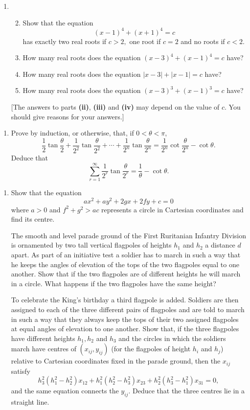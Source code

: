 \documentclass[a4, 11pt]{report}
\newlength{\qspace}
\newcounter{qnumber}
\newenvironment{question}%
 {\vspace{\qspace}
  \begin{enumerate}[\bfseries 1\quad][10]%
    \setcounter{enumi}{\value{qnumber}}%
    \item%
 }
{
  \end{enumerate}
  \filbreak
  \stepcounter{qnumber}
 }
\newenvironment{questionparts}[1][1]%
 {
  \begin{enumerate}[\bfseries (i)]%
    \setcounter{enumii}{#1}
    \addtocounter{enumii}{-1}
    \setlength{\itemsep}{5mm}
    \setlength{\parskip}{8pt}
 }
 {
  \end{enumerate}
 }
\begin{document}
\begin{question}
\begin{questionparts}
\item Show that the equation 
\[
(x-1)^{4}+(x+1)^{4}=c
\]
has exactly two real roots if $c>2,$ one root if $c=2$ and no roots
if $c<2$. 
\item How many real roots does the equation $\left(x-3\right)^{4}+\left(x-1\right)^{4}=c$
have?
\item How many real roots does the equation $\left|x-3\right|+\left|x-1\right|=c$
have?
\item How many real roots does the equation $\left(x-3\right)^{3}+\left(x-1\right)^{3}=c$
have?
\end{questionparts}

{[}The answers to parts \textbf{(ii)}, \textbf{(iii)} and \textbf{(iv)}
may depend on the value of $c$. You should give reasons for your
answers.{]}
	\end{question}
	
\begin{question}
Prove by induction, or otherwise, that, if $0<\theta<\pi$, 
\[
\frac{1}{2}\tan\frac{\theta}{2}+\frac{1}{2^{2}}\tan\frac{\theta}{2^{2}}+\cdots+\frac{1}{2^{n}}\tan\frac{\theta}{2^{n}}=\frac{1}{2^{n}}\cot\frac{\theta}{2^{n}}-\cot\theta.
\]
Deduce that 
\[
\sum_{r=1}^{\infty}\frac{1}{2^{r}}\tan\frac{\theta}{2^{r}}=\frac{1}{\theta}-\cot\theta.
\]
\end{question}
	
\begin{question}
Show that the equation 
\[
ax^{2}+ay^{2}+2gx+2fy+c=0
\]
where $a>0$ and $f^{2}+g^{2}>ac$ represents a circle in Cartesian
coordinates and find its centre. 


The smooth and level parade ground of the First Ruritanian Infantry
Division is ornamented by two tall vertical flagpoles of heights $h_{1}$
and $h_{2}$ a distance $d$ apart. As part of an initiative test
a soldier has to march in such a way that he keeps the angles of elevation
of the tops of the two flagpoles equal to one another. Show that if
the two flagpoles are of different heights he will march in a circle.
What happens if the two flagpoles have the same height?


To celebrate the King's birthday a third flagpole is added. Soldiers
are then assigned to each of the three different pairs of flagpoles
and are told to march in such a way that they always keep the tops
of their two assigned flagpoles at equal angles of elevation to one
another. Show that, if the three flagpoles have different heights
$h_{1},h_{2}$ and $h_{3}$ and the circles in which the soldiers
march have centres of $(x_{ij},y_{ij})$ (for the flagpoles of height
$h_{i}$ and $h_{j}$) relative to Cartesian coordinates fixed in
the parade ground, then the $x_{ij}$ satisfy 
\[
h_{3}^{2}\left(h_{1}^{2}-h_{2}^{2}\right)x_{12}+h_{1}^{2}\left(h_{2}^{2}-h_{3}^{2}\right)x_{23}+h_{2}^{2}\left(h_{3}^{2}-h_{1}^{2}\right)x_{31}=0,
\]
and the same equation connects the $y_{ij}$. Deduce that the three
centres lie in a straight line. 
\end{question}
		
\end{document}
